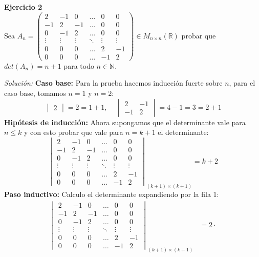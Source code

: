 \documentclass{article}
\newenvironment{problem}[2][Ejercicio]
    { \begin{mdframed}[backgroundcolor=gray!20] \textbf{#1 #2} \\}
    {  \end{mdframed}}
\newenvironment{solution}
    {\textit{Solución:}}
    {}
\begin{document}
\newpage
\begin{problem}{2}
    Sea $A_n = \begin{pmatrix} 2 & -1 & 0 & \dots & 0 & 0 \\ -1 & 2 & -1 & \dots & 0 & 0 \\ 0 & -1 & 2 & \dots & 0 & 0 \\ \vdots & \vdots & \vdots & \ddots & \vdots & \vdots \\ 0 & 0 & 0 & \dots & 2 & -1 \\ 0 & 0 & 0 & \dots & -1 & 2 \end{pmatrix} \in M_{n\times n}(\mathbb{R})$ probar que $det(A_n)=n+1$ para todo $n\in \mathbb{N}$.
\end{problem}
\begin{solution}
    \textbf{Caso base:} Para la prueba hacemos inducción fuerte sobre $n$, para el caso base, tomamos $n=1$ y $n=2$:
    \[
\begin{vmatrix}
2
\end{vmatrix} = 2 = 1+1, \ \ \ \ \ 
\begin{vmatrix}
2 & -1 \\
-1 & 2
\end{vmatrix} = 4-1 = 3 = 2+1
\]
\textbf{Hipótesis de inducción:} Ahora supongamos que el determinante vale para $n\leq k$ y con esto probar que vale para $n=k+1$ el determinante:
\[
\begin{vmatrix} 2 & -1 & 0 & \dots & 0 & 0 \\ -1 & 2 & -1 & \dots & 0 & 0 \\ 0 & -1 & 2 & \dots & 0 & 0 \\ \vdots & \vdots & \vdots & \ddots & \vdots & \vdots \\ 0 & 0 & 0 & \dots & 2 & -1 \\ 0 & 0 & 0 & \dots & -1 & 2 \end{vmatrix}_{(k+1)\times(k+1)} = k+2
\]
\textbf{Paso inductivo:} 
Calculo el determinante expandiendo por la fila 1:
\[
\begin{aligned}
\begin{vmatrix} 2 & -1 & 0 & \dots & 0 & 0 \\ -1 & 2 & -1 & \dots & 0 & 0 \\ 0 & -1 & 2 & \dots & 0 & 0 \\ \vdots & \vdots & \vdots & \ddots & \vdots & \vdots \\ 0 & 0 & 0 & \dots & 2 & -1 \\ 0 & 0 & 0 & \dots & -1 & 2 \end{vmatrix}_{(k+1)\times(k+1)} &= 2 \cdot 

\end{aligned}\]
\end{solution}
\end{document}
